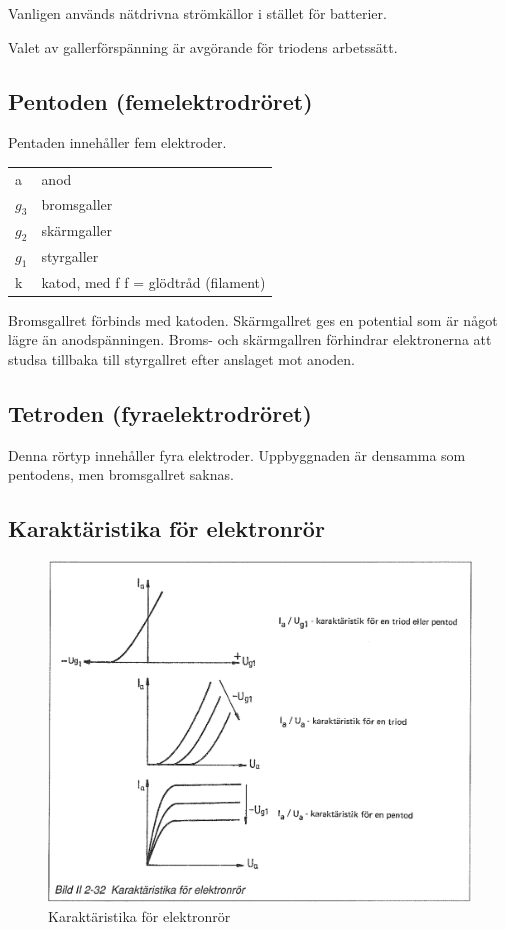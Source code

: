 Vanligen används nätdrivna strömkällor i stället för batterier.

Valet av gallerförspänning är avgörande för triodens arbetssätt.

\subsection{Pentoden (femelektrodröret)}

Pentaden innehåller fem elektroder.

\begin{tabular}{ll}
  a       & anod \\
  \(g_3\) & bromsgaller \\
  \(g_2\) & skärmgaller \\
  \(g_1\) & styrgaller \\
  k      & katod, med f f = glödtråd (filament) \\
\end{tabular}

Bromsgallret förbinds med katoden. Skärmgallret ges en potential som är något
lägre än anodspänningen. Broms- och skärmgallren förhindrar elektronerna att
studsa tillbaka till styrgallret efter anslaget mot anoden.


\subsection{Tetroden (fyraelektrodröret)}

Denna rörtyp innehåller fyra elektroder. Uppbyggnaden är densamma som pentodens,
men bromsgallret saknas.

\subsection{Karaktäristika för elektronrör}

\begin{figure}
\includegraphics[width=\textwidth]{images/bild_2_2-32}
\caption{Karaktäristika för elektronrör}
\label{fig:BildII2-32}
\end{figure}

